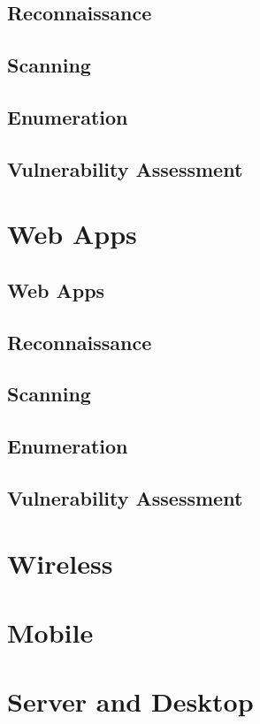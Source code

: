 \documentclass[7x9]{times}
\begin{document}
\section{Reconnaissance}
\section{Scanning}
\section{Enumeration}
\section{Vulnerability Assessment}



\chapter{Web Apps}
\section{Web Apps}
\section{Reconnaissance}
\section{Scanning}
\section{Enumeration}
\section{Vulnerability Assessment}

\chapter{Wireless}



\chapter{Mobile}

\chapter{Server and Desktop}

%




\end{document}
